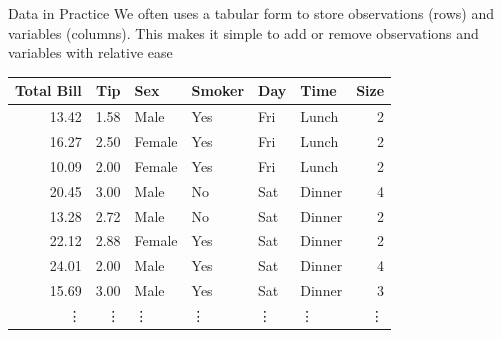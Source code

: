 \documentclass{beamer}
\begin{document}
\begin{frame}{Data in Practice}
We often uses a tabular form to store observations (rows) and variables (columns). This makes it simple to add or remove observations and variables with relative ease

\vspace{2mm}

\begin{table}[ht]
\centering
\begin{tabular}{rrllllr}
  \hline
Total Bill & Tip & Sex & Smoker & Day & Time & Size \\ 
  \hline
13.42 & 1.58 & Male & Yes & Fri & Lunch &   2 \\ 
  16.27 & 2.50 & Female & Yes & Fri & Lunch &   2 \\ 
  10.09 & 2.00 & Female & Yes & Fri & Lunch &   2 \\ 
  20.45 & 3.00 & Male & No & Sat & Dinner &   4 \\ 
  13.28 & 2.72 & Male & No & Sat & Dinner &   2 \\ 
  22.12 & 2.88 & Female & Yes & Sat & Dinner &   2 \\ 
  24.01 & 2.00 & Male & Yes & Sat & Dinner &   4 \\ 
  15.69 & 3.00 & Male & Yes & Sat & Dinner &   3 \\ 
  \vdots & \vdots & \vdots & \vdots & \vdots & \vdots & \vdots \\
   \hline
\end{tabular}
\end{table}

\end{frame}
\end{document}
